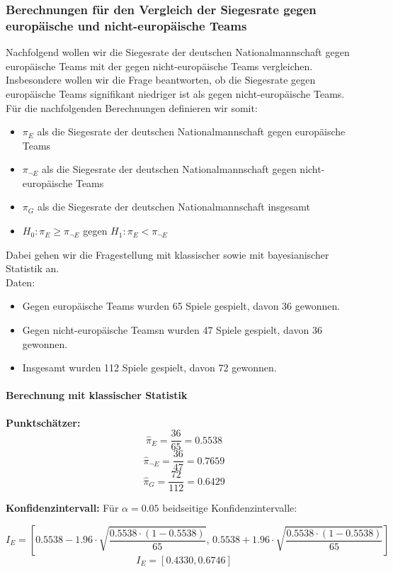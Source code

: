 \documentclass[a4paper,12pt]{article}
\begin{document}
\subsubsection{Berechnungen für den Vergleich der Siegesrate gegen europäische und nicht-europäische Teams}
Nachfolgend wollen wir die Siegesrate der deutschen Nationalmannschaft gegen europäische Teams mit der gegen nicht-europäische Teams vergleichen.
Insbesondere wollen wir die Frage beantworten, ob die Siegesrate gegen europäische Teams signifikant niedriger ist als gegen nicht-europäische Teams.
Für die nachfolgenden Berechnungen definieren wir somit:
\begin{itemize}
  \item \( \pi_E \) als die Siegesrate der deutschen Nationalmannschaft gegen europäische Teams
  \item \( \pi_{\neg E} \) als die Siegesrate der deutschen Nationalmannschaft gegen nicht-europäische Teams
  \item \( \pi_G \) als die Siegesrate der deutschen Nationalmannschaft insgesamt
  \item \( H_0 : \pi_E \geq \pi_{\neg E} \) gegen \( H_1 : \pi_E < \pi_{\neg E} \)
\end{itemize}
Dabei gehen wir die Fragestellung mit klassischer sowie mit bayesianischer Statistik an. \\

Daten:
\begin{itemize}
  \item Gegen europäische Teams wurden 65 Spiele gespielt, davon 36 gewonnen.
  \item Gegen nicht-europäische Teamsn wurden 47 Spiele gespielt, davon 36 gewonnen.
  \item Insgesamt wurden 112 Spiele gespielt, davon 72 gewonnen.
\end{itemize}

\paragraph{Berechnung mit klassischer Statistik}\leavevmode\newline

\textbf{Punktschätzer:}
\[
\hat{\pi}_E = \frac{36}{65} = 0.5538
\]
\[
\hat{\pi}_{\neg E} = \frac{36}{47} = 0.7659
\]
\[
\hat{\pi}_G = \frac{72}{112} = 0.6429
\]

\textbf{Konfidenzintervall:}
Für \(\alpha = 0.05\) beidseitige Konfidenzintervalle:

\[
I_E = \left[ 0.5538 - 1.96 \cdot \sqrt{\frac{0.5538 \cdot (1-0.5538)}{65}}, \, 0.5538 + 1.96 \cdot \sqrt{\frac{0.5538 \cdot (1-0.5538)}{65}} \right]
\]
\[
I_E = [0.4330, 0.6746]
\]
\end{document}
